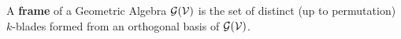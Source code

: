 \begin{definition}[Frame]
	A \textbf{frame} of a Geometric Algebra $\mathcal{G}(\mathcal{V})$ is the set of distinct (up to permutation) $k$-blades formed from an orthogonal basis of $\mathcal{G}(\mathcal{V})$.
\end{definition}
